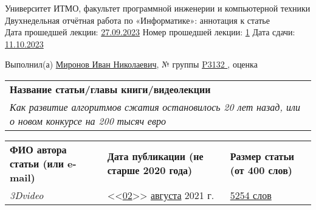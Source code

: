 \documentclass[12pt]{article}
\begin{document}
\begin{center}
\quad Университет ИТМО, факультет программной инженерии и компьютерной техники \\
\quad Двухнедельная отчётная работа по «Информатике»: аннотация к статье\\
\quad Дата прошедшей лекции: \underline{27.09.2023} 	Номер прошедшей лекции: \underline{1}	Дата сдачи: \underline{11.10.2023}

\bigskip

\quad Выполнил(а) \underline{Миронов Иван Николаевич}, № группы \underline{ P3132 }, оценка \underline{\hspace{2cm}}


\end{center}

\begin{tabularx}{\textwidth} { 
  | >{\raggedright\arraybackslash}X|}
    \hline
\textbf{Название статьи/главы книги/видеолекции}\\
    \textit{Как развитие алгоритмов сжатия остановилось 20 лет назад, или о новом конкурсе на 200 тысяч евро}\\
    \hline
\end{tabularx}

\begin{tabularx}{\textwidth} 
{ 
| >{\centering\arraybackslash}X
| >{\centering\arraybackslash}X
| >{\centering\arraybackslash}X 
|}
    \textbf{ФИО автора статьи \quad (или e-mail)} & \textbf{Дата публикации \qquad\qquad (не старше 2020 года)} & \textbf{Размер статьи \qquad\qquad (от 400 слов)} \\
     \textit{3Dvideo} & <<\underline{02}>> \underline{августа} 2021 г. & \underline{5254 слов} \\
    \hline
\end{tabularx}
\end{document}
